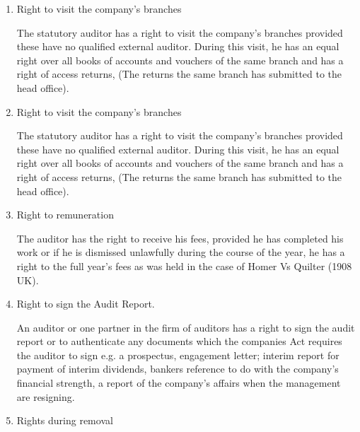\documentclass[10pt]{article}
\begin{document}
\begin{enumerate}
  The auditor has a right to obtain advice from such experts as engineers, lawyers, solicitors and valuers. However, this advice must be interpreted from the auditor's own understanding of the prevailing circumstances in order to arrive at an opinion.\\
  \item Right to visit the company's branches
  
  The statutory auditor has a right to visit the company's branches provided these have no qualified external auditor. During this visit, he has an equal right over all books of accounts and vouchers of the same branch and has a right of access returns, (The returns the same branch has submitted to the head office).\\
  \item Right to visit the company's branches
  
  The statutory auditor has a right to visit the company's branches provided these have no qualified external auditor. During this visit, he has an equal right over all books of accounts and vouchers of the same branch and has a right of access returns, (The returns the same branch has submitted to the head office).\\
  \item Right to remuneration
  
  The auditor has the right to receive his fees, provided he has completed his work or if he is dismissed unlawfully during the course of the year, he has a right to the full year's fees as was held in the case of Homer Vs Quilter (1908 UK).\\
  \item Right to sign the Audit Report.
  
  An auditor or one partner in the firm of auditors has a right to sign the audit report or to authenticate any documents which the companies Act requires the auditor to sign e.g. a prospectus, engagement letter; interim report for payment of interim dividends, bankers reference to do with the company's financial strength, a report of the company's affairs when the management are resigning.\\
  \item Rights during removal
  

\end{enumerate}
\end{document}
